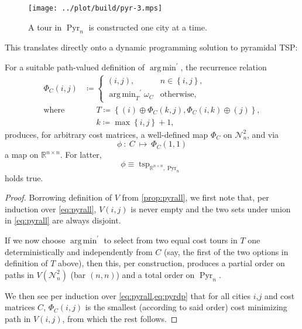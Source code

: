 \documentclass[titlepage,twoside,index=totoc,bibliography=totoc]{scrartcl}
\newcommand{\annotation}[1]{\marginpar{\small\itshape\color{green}#1}}
\DeclareMathOperator*{\argmin}{arg\,min}
\numberwithin{equation}{section}
\numberwithin{figure}{section}
\numberwithin{table}{section}
\begin{document}
\begin{figure}[hbt]
  \centering
  \texttt{[image: ../plot/build/pyr-3.mps]}
  \label{fig:pyrpart}
  \caption{A tour in $\operatorname{Pyr}_n$ is constructed one city at a time.}
\end{figure}

This translates directly onto a dynamic programming solution to pyramidal TSP:
\begin{corollary}
\label{cor:pyrdp}
  For a suitable path-valued definition of $\argmin^\prime$, the recurrence relation
  \begin{align}
    \label{eq:pyrdp}
    \Phi_C\left(i,j\right) & \coloneqq
    \begin{cases}
      \left(i,j\right), & n \in \left\{i,j\right\}, \\
      {\displaystyle \argmin_T}^\prime \omega_C & \text{otherwise},
    \end{cases}
    \\
    \text{where} & \phantom{\coloneqq}
    T \coloneqq
    \left\{
    \left(i\right) \oplus \Phi_C\left(k,j\right),
    \Phi_C\left(i,k\right) \oplus \left(j\right)
    \right\},
    \nonumber
    \\
    & \phantom{\coloneqq}
    k \coloneqq \max\left\{i,j\right\}+1,
    \nonumber
  \end{align}
  produces, for arbitrary cost matrices, a well-defined map $\Phi_C$ on $\mathcal{N}_n^2$,
  and via
  \[
    \phi~:~C~\mapsto~\Phi_C\left(1,1\right)
  \]
  a map on $\mathbb{R}^{n \times n}$.
  For latter,
  \[
    \phi \equiv \operatorname{tsp}_{\mathbb{R}^{n \times n},\operatorname{Pyr}_n}
  \]
  holds true.
\end{corollary}
\begin{proof}
  Borrowing definition of $V$ from \cref{prop:pyrall}, we first note that,
  per induction over \eqref{eq:pyrall}, $V\!\left(i,j\right)$ is never empty
  and the two sets under union in \cref{eq:pyrall} are always disjoint.

  If we now choose $\argmin^\prime$ to select from two equal cost tours in
  $T$ one deterministically and independently from $C$ (say, the first of
  the two options in definition of $T$ above), then this, per construction,
  produces a partial order on paths in $V\!\left(\mathcal{N}_n^2\right)$ (bar
  $(n,n)$) and a total order on $\operatorname{Pyr}_n$.

  We then see per induction over \cref{eq:pyrall,eq:pyrdp} that for all
  cities $i$,$j$ and cost matrices $C$, $\Phi_C\left(i,j\right)$ is the
  smallest (according to said order) cost minimizing path in $V\!\left(i,j\right)$,
  from which the rest follows.
\end{proof}
\end{document}
